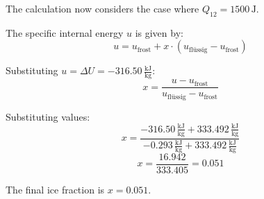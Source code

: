 The calculation now considers the case where \( Q_{12} = 1500 \, \text{J} \).  

The specific internal energy \( u \) is given by:  
\[
u = u_{\text{frost}} + x \cdot (u_{\text{flüssig}} - u_{\text{frost}})
\]  

Substituting \( u = \Delta U = -316.50 \, \frac{\text{kJ}}{\text{kg}} \):  
\[
x = \frac{u - u_{\text{frost}}}{u_{\text{flüssig}} - u_{\text{frost}}}
\]  

Substituting values:  
\[
x = \frac{-316.50 \, \frac{\text{kJ}}{\text{kg}} + 333.492 \, \frac{\text{kJ}}{\text{kg}}}{-0.293 \, \frac{\text{kJ}}{\text{kg}} + 333.492 \, \frac{\text{kJ}}{\text{kg}}}
\]  
\[
x = \frac{16.942}{333.405} = 0.051
\]  

The final ice fraction is \( x = 0.051 \).